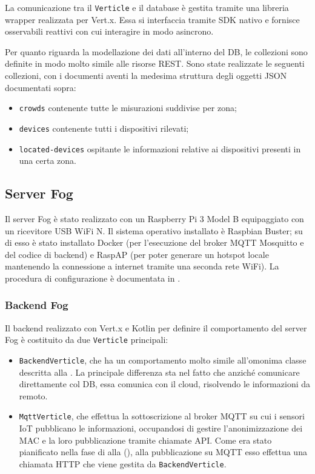 La comunicazione tra il \texttt{Verticle} e il database è gestita tramite una libreria wrapper realizzata per Vert.x.
Essa si interfaccia tramite SDK nativo e fornisce osservabili reattivi con cui interagire in modo asincrono.

Per quanto riguarda la modellazione dei dati all'interno del DB, le collezioni sono definite in modo molto simile alle risorse REST\@.
Sono state realizzate le seguenti collezioni, con i documenti aventi la medesima struttura degli oggetti JSON documentati sopra:

\begin{itemize}
  \item \texttt{crowds} contenente tutte le misurazioni suddivise per zona;
  \item \texttt{devices} contenente tutti i dispositivi rilevati;
  \item \texttt{located-devices} ospitante le informazioni relative ai dispositivi presenti in una certa zona.
\end{itemize}

\subsection{Server Fog}

Il server Fog è stato realizzato con un Raspberry Pi 3 Model B equipaggiato con un ricevitore USB WiFi N.
Il sistema operativo installato è Raspbian Buster; su di esso è stato installato Docker (per l'esecuzione del broker MQTT Mosquitto e del codice di backend) e RaspAP (per poter generare un hotspot locale mantenendo la connessione a internet tramite una seconda rete WiFi).
La procedura di configurazione è documentata in .

\subsubsection{Backend Fog}

Il backend realizzato con Vert.x e Kotlin per definire il comportamento del server Fog è costituito da due \texttt{Verticle} principali:

\begin{itemize}
  \item
    \texttt{BackendVerticle}, che ha un comportamento molto simile all'omonima classe descritta alla .
    La principale differenza sta nel fatto che anziché comunicare direttamente col DB, essa comunica con il cloud, risolvendo le informazioni da remoto.
  \item
    \texttt{MqttVerticle}, che effettua la sottoscrizione al broker MQTT su cui i sensori IoT pubblicano le informazioni, occupandosi di gestire l'anonimizzazione dei MAC e la loro pubblicazione tramite chiamate API\@.
    Come era stato pianificato nella fase di  alla  (), alla pubblicazione su MQTT esso effettua una chiamata HTTP che viene gestita da \texttt{BackendVerticle}.
\end{itemize}

